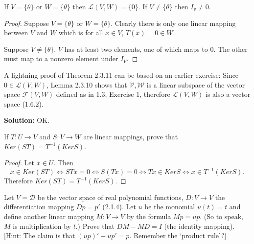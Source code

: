 \begin{tcolorbox}[title=Problem 21, breakable]
    If $V = \{\theta\}$ or $W = \{\theta\}$ then $\mathcal{L}(V, W) = \{0\}$.
    If $V \ne \{\theta\}$ then $I_v \ne 0$.
\end{tcolorbox}

\begin{proof}
    Suppose $V = \{\theta\}$ or $W = \{\theta\}$.
    Clearly there is only one linear mapping between $V$ and $W$
    which is for all $x \in V$, $T(x) = 0 \in W$.

    Suppose $V \ne \{\theta\}$. $V$ has at least two elements,
    one of which maps to $0$.
    The other must map to a nonzero element under $I_V$.
\end{proof}

\begin{tcolorbox}[title=Problem 22, breakable]
    A lightning proof of Theorem 2.3.11 can be based on an earlier exercise:
    Since $0 \in \mathcal{L}(V, W)$, Lemma 2.3.10 shows that $\mathcal{V, W}$
    is a linear subspace of the vector space $\mathcal{F}(V, W)$ defined as in 
    1.3, Exercise 1, therefore $\mathcal{L}(V, W)$ is also a vector space (1.6.2).
\end{tcolorbox}

\textbf{Solution:} OK.

\begin{tcolorbox}[title=Problem 23, breakable]
    If $T : U \longrightarrow V$ and $S : V \longrightarrow W$
        are linear mappings, prove that $Ker(ST) = T^{-1}(Ker S)$.
\end{tcolorbox}

\begin{proof}
    Let $x \in U$. Then
    \[
        x \in Ker(ST)
        \iff STx = 0
        \iff S(Tx) = 0
        \iff Tx \in Ker S
        \iff x \in T^{-1}(Ker S).
    \]
    Therefore $Ker(ST) = T^{-1}(Ker S)$.
\end{proof}

\begin{tcolorbox}[title=Problem 24, breakable]
    Let $V = \mathcal{D}$ be the vector space of real polynomial functions,
    $D : V \longrightarrow V$ the differentiation mapping $Dp = p'$ (2.1.4).
    Let $u$ be the monomial $u(t) = t$ and define another linear mapping 
    $M : V \longrightarrow V$ by the formula $Mp = up$. (So to speak,
    $M$ is multiplication by $t$.) Prove that $DM - MD = I$ (the identity mapping).
    [Hint: The claim is that $(up)' - up' = p$. Remember the `product rule'?]
\end{tcolorbox}

